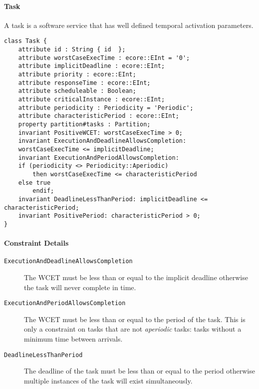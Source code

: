 \paragraph{Task}
A task is a software service that has well defined temporal activation parameters.
\begin{lstlisting}[caption=Task constraints]
class Task {
    attribute id : String { id  };
    attribute worstCaseExecTime : ecore::EInt = '0';
    attribute implicitDeadline : ecore::EInt;
    attribute priority : ecore::EInt;
    attribute responseTime : ecore::EInt;
    attribute scheduleable : Boolean;
    attribute criticalInstance : ecore::EInt;
    attribute periodicity : Periodicity = 'Periodic';
    attribute characteristicPeriod : ecore::EInt;
    property partition#tasks : Partition;
    invariant PositiveWCET: worstCaseExecTime > 0;
    invariant ExecutionAndDeadlineAllowsCompletion:
	worstCaseExecTime <= implicitDeadline;
    invariant ExecutionAndPeriodAllowsCompletion: 
	if (periodicity <> Periodicity::Aperiodic)
	    then worstCaseExecTime <= characteristicPeriod
	else true
	    endif;
    invariant DeadlineLessThanPeriod: implicitDeadline <= characteristicPeriod;
    invariant PositivePeriod: characteristicPeriod > 0;
}
\end{lstlisting}
\paragraph{Constraint Details} 
\begin{description}
\item[\texttt{ExecutionAndDeadlineAllowsCompletion}] The WCET must be less than or equal to the implicit deadline otherwise the task will never complete in time.
\item[\texttt{ExecutionAndPeriodAllowsCompletion}] The WCET must be less than or equal to the period of the task. This is only a constraint on tasks that are not 
\textit{aperiodic} tasks: tasks without a minimum time between arrivals.
\item[\texttt{DeadlineLessThanPeriod}] The deadline of the task must be less than or equal to the period otherwise multiple instances of the task will exist simultaneously.
\end{description}

